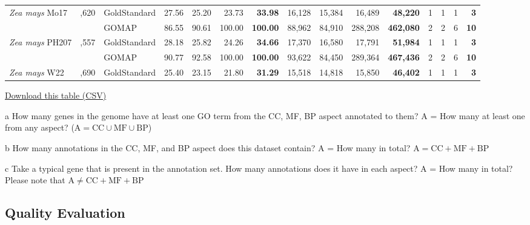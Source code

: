 \documentclass[utf8]{frontiersSCNS}
\begin{document}
\begin{table}[t]
{\begin{threeparttable}
\begin{tabular}{lrlrrr>{\bfseries}r|rrr>{\bfseries}r|rrr>{\bfseries}r}
\multirow{-2}{*}{\raggedright\arraybackslash \textit{Zea mays} Mo17} & \multirow{-2}{*}{\raggedleft\arraybackslash 38,620} & GoldStandard & 27.56 & 25.20 & 23.73 & 33.98 & 16,128 & 15,384 & 16,489 & 48,220 & 1 & 1 & 1 & 3\\
\cmidrule{1-15}
\rowcolor{gray!6}   &  & GOMAP & 86.55 & 90.61 & 100.00 & 100.00 & 88,962 & 84,910 & 288,208 & 462,080 & 2 & 2 & 6 & 10\\

\multirow{-2}{*}{\raggedright\arraybackslash \textit{Zea mays} PH207} & \multirow{-2}{*}{\raggedleft\arraybackslash 40,557} & GoldStandard & 28.18 & 25.82 & 24.26 & 34.66 & 17,370 & 16,580 & 17,791 & 51,984 & 1 & 1 & 1 & 3\\
\cmidrule{1-15}
\rowcolor{gray!6}   &  & GOMAP & 90.77 & 92.58 & 100.00 & 100.00 & 93,622 & 84,450 & 289,364 & 467,436 & 2 & 2 & 6 & 10\\

\multirow{-2}{*}{\raggedright\arraybackslash \textit{Zea mays} W22} & \multirow{-2}{*}{\raggedleft\arraybackslash 40,690} & GoldStandard & 25.40 & 23.15 & 21.80 & 31.29 & 15,518 & 14,818 & 15,850 & 46,402 & 1 & 1 & 1 & 3\\
\bottomrule
\end{tabular}
\begin{tablenotes}
\item \href{https://raw.githubusercontent.com/Dill-PICL/GOMAP-Paper-2019.1/master/analyses/quantity/results/quantity_table.csv}{Download this table (CSV)}
\item[a] How many genes in the genome have at least one GO term from the CC, MF, BP aspect annotated to them? A = How many at least one from any aspect? ($\textrm{A} = \textrm{CC} \cup \textrm{MF} \cup \textrm{BP}$)
\item[b] How many annotations in the CC, MF, and BP aspect does this dataset contain? A = How many in total? $\textrm{A} = \textrm{CC} + \textrm{MF} + \textrm{BP}$
\item[c] Take a typical gene that is present in the annotation set. How many annotations does it have in each aspect? A = How many in total? Please note that $\textrm{A} \neq \textrm{CC} + \textrm{MF} +\textrm{BP}$
\end{tablenotes}
\end{threeparttable}}
\end{table}

\hypertarget{quality-evaluation-1}{%
\subsection{Quality Evaluation}\label{quality-evaluation-1}}
\end{document}
